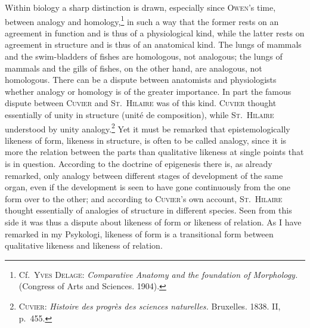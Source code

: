 \documentclass[12pt]{book}
\newcommand{\opage}[1]{\marginnote{\footnotesize\textit{[#1]}}}
\begin{document}
Within biology a sharp distinction is drawn, especially since \textsc{Owen}'s
time, between analogy and homology,\footnote{Cf.\ \textsc{Yves Delage:}
\textit{Comparative Anatomy and the foundation of Morphology.} (Congress of Arts
and Sciences. 1904).} in such a way that the former rests on an agreement in
function and is thus of a physiological kind, while the latter rests on agreement
in structure and is thus of an anatomical kind. The lungs of mammals and the
swim-bladders of fishes are homologous, not analogous; the lungs of mammals and
the gills of fishes, on the other hand, are analogous, not homologous. There can
be a dispute between anatomists and physiologists whether analogy or homology is
of the greater importance. In part the famous dispute between \textsc{Cuvier} and
\textsc{St.\ Hilaire} was of this kind. \textsc{Cuvier} thought essentially of
unity in structure (unité de composition), while \textsc{St.\ Hilaire} understood
by unity analogy.\footnote{\textsc{Cuvier:} \textit{Histoire des progrès des
sciences naturelles.} Bruxelles. 1838. II, p.\ 455.} Yet it must be remarked that
epistemologically likeness of form, likeness in structure, is often to be called
analogy, since it is more the relation between the parts than qualitative likeness
at single points that is in question. According to the doctrine of epigenesis
there is, as already remarked, only analogy between different stages of
development of the same organ, even if the development is seen to have gone
continuously from the one form over to the other; and according to
\textsc{Cuvier}'s own account, \textsc{St.\ Hilaire} thought essentially of
analogies of structure in different species. Seen from this side it was thus a
dispute about likeness of form or likeness of relation. As I have remarked in my
\opage{106}Psykologi, likeness of form is a transitional form between qualitative likeness
and likeness of relation.
\end{document}
